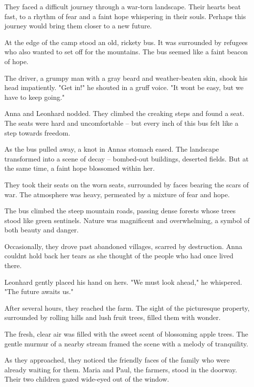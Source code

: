 \documentclass[
]{article}
\begin{document}
They faced a difficult journey through a war-torn landscape. Their hearts beat fast, to a rhythm of fear and a faint hope whispering in their souls. Perhaps this journey would bring them closer to a new future.

At the edge of the camp stood an old, rickety bus. It was surrounded by refugees who also wanted to set off for the mountains. The bus seemed like a faint beacon of hope.

The driver, a grumpy man with a gray beard and weather-beaten skin, shook his head impatiently. "Get in!" he shouted in a gruff voice. "It won\textquotesingle t be easy, but we have to keep going."

Anna and Leonhard nodded. They climbed the creaking steps and found a seat. The seats were hard and uncomfortable -- but every inch of this bus felt like a step towards freedom.

As the bus pulled away, a knot in Anna\textquotesingle s stomach eased. The landscape transformed into a scene of decay -- bombed-out buildings, deserted fields. But at the same time, a faint hope blossomed within her.

They took their seats on the worn seats, surrounded by faces bearing the scars of war. The atmosphere was heavy, permeated by a mixture of fear and hope.

The bus climbed the steep mountain roads, passing dense forests whose trees stood like green sentinels. Nature was magnificent and overwhelming, a symbol of both beauty and danger.

Occasionally, they drove past abandoned villages, scarred by destruction. Anna couldn\textquotesingle t hold back her tears as she thought of the people who had once lived there.

Leonhard gently placed his hand on hers. "We must look ahead," he whispered. "The future awaits us."

After several hours, they reached the farm. The sight of the picturesque property, surrounded by rolling hills and lush fruit trees, filled them with wonder.

The fresh, clear air was filled with the sweet scent of blossoming apple trees. The gentle murmur of a nearby stream framed the scene with a melody of tranquility.

As they approached, they noticed the friendly faces of the family who were already waiting for them. Maria and Paul, the farmers, stood in the doorway. Their two children gazed wide-eyed out of the window.
\end{document}
